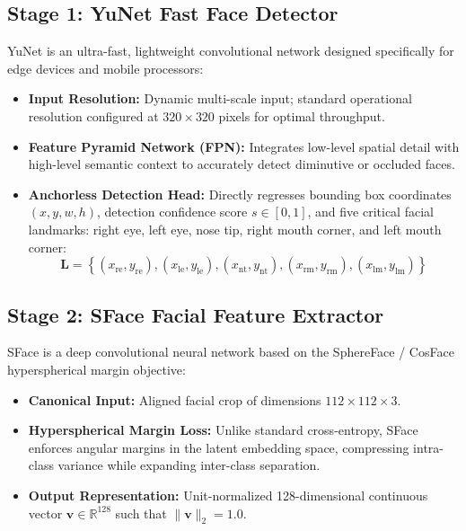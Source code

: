 \subsection{Stage 1: YuNet Fast Face Detector}
YuNet is an ultra-fast, lightweight convolutional network designed specifically for edge devices and mobile processors:
\begin{itemize}
    \item \textbf{Input Resolution:} Dynamic multi-scale input; standard operational resolution configured at $320 \times 320$ pixels for optimal throughput.
    \item \textbf{Feature Pyramid Network (FPN):} Integrates low-level spatial detail with high-level semantic context to accurately detect diminutive or occluded faces.
    \item \textbf{Anchorless Detection Head:} Directly regresses bounding box coordinates $(x, y, w, h)$, detection confidence score $s \in [0, 1]$, and five critical facial landmarks: right eye, left eye, nose tip, right mouth corner, and left mouth corner:
    \begin{equation}
    \mathbf{L} = \left\{ (x_{\text{re}}, y_{\text{re}}), (x_{\text{le}}, y_{\text{le}}), (x_{\text{nt}}, y_{\text{nt}}), (x_{\text{rm}}, y_{\text{rm}}), (x_{\text{lm}}, y_{\text{lm}}) \right\}
    \end{equation}
\end{itemize}

\subsection{Stage 2: SFace Facial Feature Extractor}
SFace is a deep convolutional neural network based on the SphereFace / CosFace hyperspherical margin objective:
\begin{itemize}
    \item \textbf{Canonical Input:} Aligned facial crop of dimensions $112 \times 112 \times 3$.
    \item \textbf{Hyperspherical Margin Loss:} Unlike standard cross-entropy, SFace enforces angular margins in the latent embedding space, compressing intra-class variance while expanding inter-class separation.
    \item \textbf{Output Representation:} Unit-normalized 128-dimensional continuous vector $\mathbf{v} \in \mathbb{R}^{128}$ such that $\|\mathbf{v}\|_2 = 1.0$.
\end{itemize}

